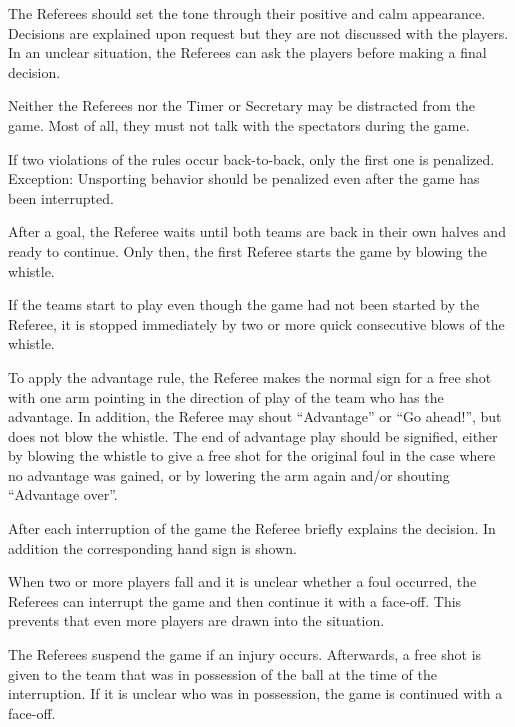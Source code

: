The Referees should set the tone through their positive and calm appearance.
Decisions are explained upon request but they are not discussed with the players.
In an unclear situation, the Referees can ask the players before making a final decision.

Neither the Referees nor the Timer or Secretary may be distracted from the game.
Most of all, they must not talk with the spectators during the game.

If two violations of the rules occur back-to-back, only the first one is penalized.
Exception: Unsporting behavior should be penalized even after the game has been interrupted.

After a goal, the Referee waits until both teams are back in their own halves and ready to continue.
Only then, the first Referee starts the game by blowing the whistle.

If the teams start to play even though the game had not been started by the Referee, it is stopped immediately by two or more quick consecutive blows of the whistle.

To apply the advantage rule, the Referee makes the normal sign for a free shot with one arm pointing in the direction of play of the team who has the advantage.
In addition, the Referee may shout ``Advantage'' or ``Go ahead!'', but does not blow the whistle.
The end of advantage play should be signified, either by blowing the whistle to give a free shot for the original foul in the case where no advantage was gained, or by lowering the arm again and/or shouting ``Advantage over''.

After each interruption of the game the Referee briefly explains the decision.
In addition the corresponding hand sign is shown.

When two or more players fall and it is unclear whether a foul occurred, the Referees can interrupt the game and then continue it with a face-off.
This prevents that even more players are drawn into the situation.

The Referees suspend the game if an injury occurs.
Afterwards, a free shot is given to the team that was in possession of the ball at the time of the interruption.
If it is unclear who was in possession, the game is continued with a face-off.

